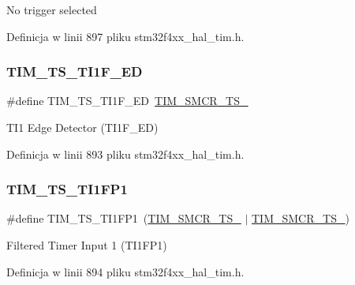 No trigger selected 

Definicja w linii 897 pliku stm32f4xx\+\_\+hal\+\_\+tim.\+h.

\mbox{\label{group___t_i_m___trigger___selection_ga8c89554efc693e679c94b5a749af123c}} 
\subsubsection{\texorpdfstring{T\+I\+M\+\_\+\+T\+S\+\_\+\+T\+I1\+F\+\_\+\+ED}{TIM\_TS\_TI1F\_ED}}
{\footnotesize\ttfamily \#define T\+I\+M\+\_\+\+T\+S\+\_\+\+T\+I1\+F\+\_\+\+ED~\hyperlink{group___peripheral___registers___bits___definition_gacf0dbaf4a2ec8759f283f82a958ef6a8}{T\+I\+M\+\_\+\+S\+M\+C\+R\+\_\+\+T\+S\+\_}}

T\+I1 Edge Detector (T\+I1\+F\+\_\+\+ED) 

Definicja w linii 893 pliku stm32f4xx\+\_\+hal\+\_\+tim.\+h.

\mbox{\label{group___t_i_m___trigger___selection_ga38d3514d54bcdb0ea8ac8bd91c5832b5}} 
\subsubsection{\texorpdfstring{T\+I\+M\+\_\+\+T\+S\+\_\+\+T\+I1\+F\+P1}{TIM\_TS\_TI1FP1}}
{\footnotesize\ttfamily \#define T\+I\+M\+\_\+\+T\+S\+\_\+\+T\+I1\+F\+P1~(\hyperlink{group___peripheral___registers___bits___definition_ga8d1f040f9259acb3c2fba7b0c7eb3d96}{T\+I\+M\+\_\+\+S\+M\+C\+R\+\_\+\+T\+S\+\_} $\vert$ \hyperlink{group___peripheral___registers___bits___definition_gacf0dbaf4a2ec8759f283f82a958ef6a8}{T\+I\+M\+\_\+\+S\+M\+C\+R\+\_\+\+T\+S\+\_})}

Filtered Timer Input 1 (T\+I1\+F\+P1) 

Definicja w linii 894 pliku stm32f4xx\+\_\+hal\+\_\+tim.\+h.

